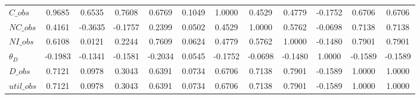 \begin{center}
\begin{longtable}{lccccccccccc}
$C\_obs      $	 & 	        0.9685	 & 	        0.6535	 & 	        0.7608	 & 	        0.6769	 & 	        0.1049	 & 	        1.0000	 & 	        0.4529	 & 	        0.4779	 & 	       -0.1752	 & 	        0.6706	 & 	        0.6706 \\ 
$NC\_obs     $	 & 	        0.4161	 & 	       -0.3635	 & 	       -0.1757	 & 	        0.2399	 & 	        0.0502	 & 	        0.4529	 & 	        1.0000	 & 	        0.5762	 & 	       -0.0698	 & 	        0.7138	 & 	        0.7138 \\ 
$NI\_obs     $	 & 	        0.6108	 & 	        0.0121	 & 	        0.2244	 & 	        0.7609	 & 	        0.0624	 & 	        0.4779	 & 	        0.5762	 & 	        1.0000	 & 	       -0.1480	 & 	        0.7901	 & 	        0.7901 \\ 
${\theta_D}  $	 & 	       -0.1983	 & 	       -0.1341	 & 	       -0.1581	 & 	       -0.2034	 & 	        0.0545	 & 	       -0.1752	 & 	       -0.0698	 & 	       -0.1480	 & 	        1.0000	 & 	       -0.1589	 & 	       -0.1589 \\ 
$D\_obs      $	 & 	        0.7121	 & 	        0.0978	 & 	        0.3043	 & 	        0.6391	 & 	        0.0734	 & 	        0.6706	 & 	        0.7138	 & 	        0.7901	 & 	       -0.1589	 & 	        1.0000	 & 	        1.0000 \\ 
$util\_obs   $	 & 	        0.7121	 & 	        0.0978	 & 	        0.3043	 & 	        0.6391	 & 	        0.0734	 & 	        0.6706	 & 	        0.7138	 & 	        0.7901	 & 	       -0.1589	 & 	        1.0000	 & 	        1.0000 \\ 
\end{longtable}
 \end{center}
